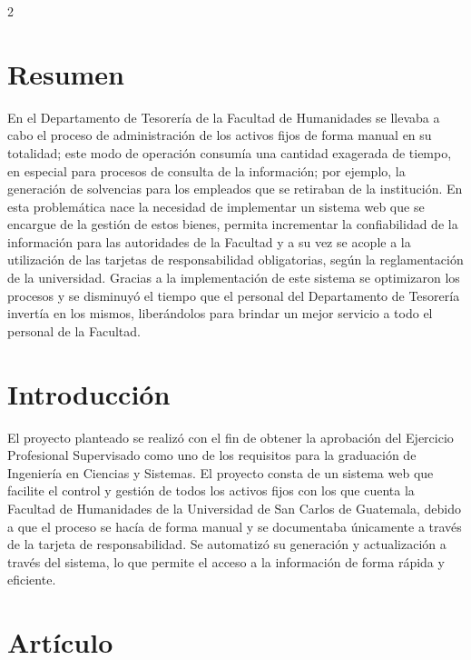 \documentclass[12pt,spanish,Letterpaper,openany]{book}
\begin{document}
\begin {multicols}{2}

\hypertarget{resumen-5}{%
\section{Resumen}\label{resumen-5}}

En el Departamento de Tesorería de la Facultad de Humanidades se llevaba a cabo el proceso de administración de los activos fijos de forma manual en su totalidad; este modo de operación consumía una cantidad exagerada de tiempo, en especial para procesos de consulta de la información; por ejemplo, la generación de solvencias para los empleados que se retiraban de la institución. En esta problemática nace la necesidad de implementar un sistema web que se encargue de la gestión de estos bienes, permita incrementar la confiabilidad de la información para las autoridades de la Facultad y a su vez se acople a la utilización de las tarjetas de responsabilidad obligatorias, según la reglamentación de la universidad. Gracias a la implementación de este sistema se optimizaron los procesos y se disminuyó el tiempo que el personal del Departamento de Tesorería invertía en los mismos, liberándolos para brindar un mejor servicio a todo el personal de la Facultad.

\hypertarget{introducciuxf3n-7}{%
\section{Introducción}\label{introducciuxf3n-7}}

El proyecto planteado se realizó con el fin de obtener la aprobación del Ejercicio Profesional Supervisado como uno de los requisitos para la graduación de Ingeniería en Ciencias y Sistemas. El proyecto consta de un sistema web que facilite el control y gestión de todos los activos fijos con los que cuenta la Facultad de Humanidades de la Universidad de San Carlos de Guatemala, debido a que el proceso se hacía de forma manual y se documentaba únicamente a través de la tarjeta de responsabilidad. Se automatizó su generación y actualización a través del sistema, lo que permite el acceso a la información de forma rápida y eficiente.

\hypertarget{artuxedculo-6}{%
\section{Artículo}\label{artuxedculo-6}}


\end{multicols}
\end{document}

